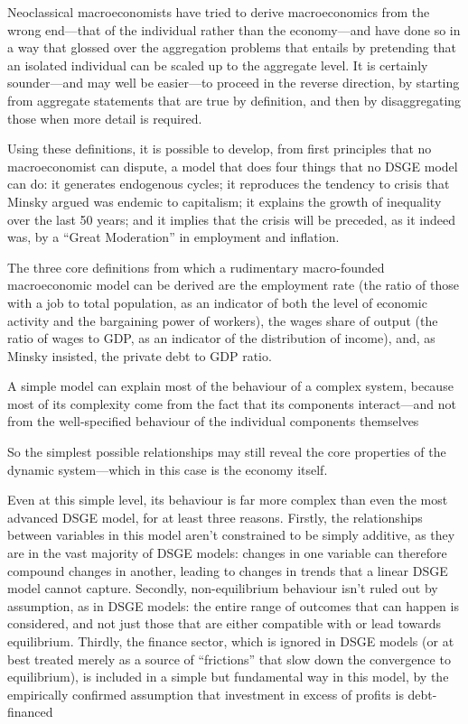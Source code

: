 \documentclass[
]{book}
\begin{document}
Neoclassical macroeconomists have tried to derive macroeconomics from the wrong end---that of the individual rather than the economy---and have done so in a way that glossed over the aggregation problems that entails by pretending that an isolated individual can be scaled up to the aggregate level. It is certainly sounder---and may well be easier---to proceed in the reverse direction, by starting from aggregate statements that are true by definition, and then by disaggregating those when more detail is required.

Using these definitions, it is possible to develop, from first principles that no macroeconomist can dispute, a model that does four things that no DSGE model can do: it generates endogenous cycles; it reproduces the tendency to crisis that Minsky argued was endemic to capitalism; it explains the growth of inequality over the last 50 years; and it implies that the crisis will be preceded, as it indeed was, by a ``Great Moderation'' in employment and inflation.

The three core definitions from which a rudimentary macro-founded macroeconomic model can be derived are the employment rate (the ratio of those with a job to total population, as an indicator of both the level of economic activity and the bargaining power of workers), the wages share of output (the ratio of wages to GDP, as an indicator of the distribution of income), and, as Minsky insisted, the private debt to GDP ratio.

A simple model can explain most of the behaviour of a complex system, because most of its complexity come from the fact that its components interact---and not from the well-specified behaviour of the individual components themselves

So the simplest possible relationships may still reveal the core properties of the dynamic system---which in this case is the economy itself.

Even at this simple level, its behaviour is far more complex than even the most advanced DSGE model, for at least three reasons. Firstly, the relationships between variables in this model aren't constrained to be simply additive, as they are in the vast majority of DSGE models: changes in one variable can therefore compound changes in another, leading to changes in trends that a linear DSGE model cannot capture. Secondly, non-equilibrium behaviour isn't ruled out by assumption, as in DSGE models: the entire range of outcomes that can happen is considered, and not just those that are either compatible with or lead towards equilibrium. Thirdly, the finance sector, which is ignored in DSGE models (or at best treated merely as a source of ``frictions'' that slow down the convergence to equilibrium), is included in a simple but fundamental way in this model, by the empirically confirmed assumption that investment in excess of profits is debt-financed
\end{document}

